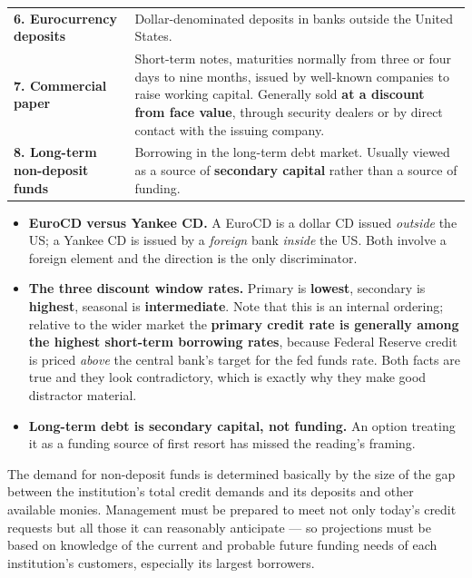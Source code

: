\begin{center}
\begin{longtable}{@{}p{3.5cm} p{10.6cm}@{}}
\addlinespace
\textbf{6. Eurocurrency deposits} &
Dollar-denominated deposits in banks outside the United States. \\
\addlinespace
\textbf{7. Commercial paper} &
Short-term notes, maturities normally from three or four days to nine months, issued by well-known companies to raise working capital. Generally sold \textbf{at a discount from face value}, through security dealers or by direct contact with the issuing company. \\
\addlinespace
\textbf{8. Long-term non-deposit funds} &
Borrowing in the long-term debt market. Usually viewed as a source of \textbf{secondary capital} rather than a source of funding. \\
\bottomrule
\end{longtable}
\end{center}

\begin{lrtrapbox}
\begin{itemize}
\item \textbf{EuroCD versus Yankee CD.} A EuroCD is a dollar CD issued \emph{outside} the US; a Yankee CD is issued by a \emph{foreign} bank \emph{inside} the US. Both involve a foreign element and the direction is the only discriminator.
\item \textbf{The three discount window rates.} Primary is \textbf{lowest}, secondary is \textbf{highest}, seasonal is \textbf{intermediate}. Note that this is an internal ordering; relative to the wider market the \textbf{primary credit rate is generally among the highest short-term borrowing rates}, because Federal Reserve credit is priced \emph{above} the central bank's target for the fed funds rate. Both facts are true and they look contradictory, which is exactly why they make good distractor material.
\item \textbf{Long-term debt is secondary capital, not funding.} An option treating it as a funding source of first resort has missed the reading's framing.
\end{itemize}
\end{lrtrapbox}


The demand for non-deposit funds is determined basically by the size of the gap between the institution's total credit demands and its deposits and other available monies. Management must be prepared to meet not only today's credit requests but all those it can reasonably anticipate --- so projections must be based on knowledge of the current and probable future funding needs of each institution's customers, especially its largest borrowers.

